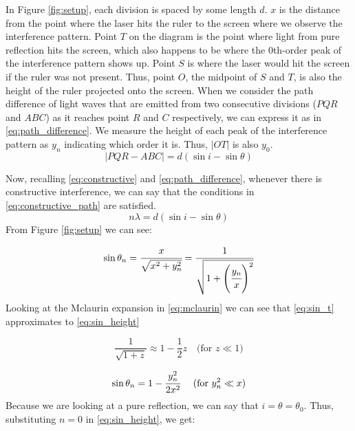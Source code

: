 \documentclass{article}
\begin{document}
In Figure \ref{fig:setup}, each division is spaced by some length $d$. $x$ is the distance from the point where the laser hits the ruler to the screen where we observe the interference pattern. Point $T$ on the diagram is the point where light from pure reflection hits the screen, which also happens to be where the 0th-order peak of the interference pattern shows up. Point $S$ is where the laser would hit the screen if the ruler was not present. Thus, point $O$, the midpoint of $S$ and $T$, is also the height of the ruler projected onto the screen. When we consider the path difference of light waves that are emitted from two consecutive divisions ($PQR$ and $ABC$) as it reaches point $R$ and $C$ respectively, we can express it as in \eqref{eq:path_difference}. We measure the height of each peak of the interference pattern as $y_n$ indicating which order it is. Thus, $|OT|$ is also $y_0$.
\begin{equation}\label{eq:path_difference}
  |PQR - ABC| = d(\sin{i}-\sin{\theta})
\end{equation}

Now, recalling \eqref{eq:constructive} and \eqref{eq:path_difference}, whenever there is constructive interference, we can say that the conditions in \eqref{eq:constructive_path} are satisfied.
\begin{equation}\label{eq:constructive_path}
  n\lambda = d(\sin{i} - \sin{\theta})
\end{equation}
From Figure \ref{fig:setup} we can see:

\begin{equation}\label{eq:sin_t}
  \sin{\theta_n} = \cfrac{x}{\sqrt{x^2 + y_{n}^{2}}}
  = \cfrac{1}{
      \sqrt{1 + \left( \cfrac{y_n}{x} \right)^2}
    }
\end{equation}
Looking at the Mclaurin expansion in \eqref{eq:mclaurin} we can see that \eqref{eq:sin_t} approximates to \eqref{eq:sin_height}

\begin{equation}\label{eq:mclaurin}
  \frac{1}{\sqrt{1+z}} \approx 1 - \frac{1}{2}z \quad \text{(for $z\ll 1$)}
\end{equation}

\begin{equation}\label{eq:sin_height}
  \sin{\theta_n} = 1 - \cfrac{ y_{n}^{2} }{ 2x^2 } \quad \text{ (for $y_{n}^{2} \ll x$)}
\end{equation}
Because we are looking at a pure reflection, we can say that $i = \theta = \theta_0$. Thus, substituting $n=0$ in \eqref{eq:sin_height}, we get:
\end{document}

